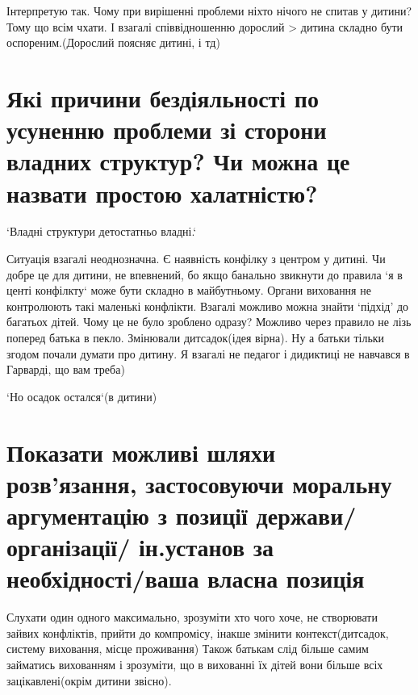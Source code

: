 \documentclass[a4paper,12pt]{article}
\begin{document}
    Інтерпретую так. Чому при вирішенні проблеми ніхто нічого не спитав у дитини? Тому що всім чхати.
    І взагалі співвідношенню дорослий > дитина складно бути оспореним.(Дорослий поясняє дитині, і тд)

    \section{Які причини бездіяльності по усуненню проблеми зі сторони владних структур? Чи можна це назвати простою халатністю?}
    `Владні структури детостатньо владні.`

    Ситуація взагалі неоднозначна. Є наявність конфілку з центром у дитині. Чи добре це для дитини, не впевнений, бо
    якщо банально звикнути до правила `я в центі конфілкту` може бути складно в майбутньому.
    Органи виховання не контролюють такі маленькі конфлікти. Взагалі можливо можна знайти `підхід' до багатьох дітей.
    Чому це не було зроблено одразу? Можливо через правило не лізь поперед батька в пекло. Змінювали дитсадок(ідея вірна).
    Ну а батьки тільки згодом почали думати про дитину. Я взагалі не педагог і дидиктиці не навчався в Гарварді, що вам треба)

    `Но осадок остался`(в дитини)

    \section{Показати можливі шляхи розв’язання, застосовуючи моральну аргументацію з позиції держави/організації/ ін.установ за необхідності/ваша власна позиція}
    Слухати один одного максимально, зрозуміти хто чого хоче, не створювати зайвих конфліктів, прийти до компромісу, інакше змінити контекст(дитсадок, систему виховання, місце проживання)
    Також батькам слід більше самим займатись вихованням і зрозуміти, що в вихованні їх дітей вони більше всіх зацікавлені(окрім дитини звісно).

    \pagestyle{empty}
\end{document}
